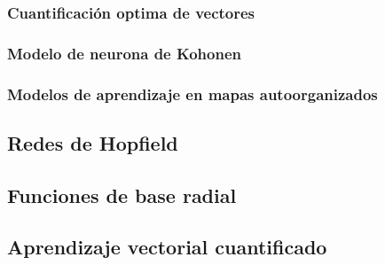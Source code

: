 \subsubsection{Cuantificación optima de vectores}



\subsubsection{Modelo de neurona de Kohonen}


\subsubsection{Modelos de aprendizaje en mapas autoorganizados}



\subsection{Redes de Hopfield}



\subsection{Funciones de base radial}



\subsection{Aprendizaje vectorial cuantificado}
